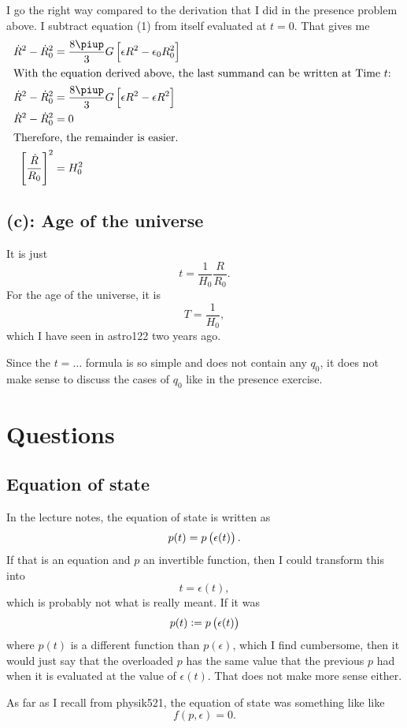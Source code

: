 I go the right way compared to the derivation that I did in the presence
problem above. I subtract equation (1) from itself evaluated at $t=0$. That
gives me
\begin{align*}
    \dot R^2 - \dot R_0^2 &= \frac{8\piup}3 G \sbr{\epsilon R^2 - \epsilon_0
R_0^2} \\
\intertext{%
    With the equation derived above, the last summand can be written at Time $t$:
}
    \dot R^2 - \dot R_0^2 &= \frac{8\piup}3 G \sbr{\epsilon R^2 - \epsilon
R^2} \\
    \dot R^2 - \dot R_0^2 &= 0 \\
\intertext{%
    Therefore, the remainder is easier.
}
\sbr{\frac{\dot R}{R_0}}^2 &= H_0^2
\end{align*}

\subsection*{(c): Age of the universe}

It is just
\[
    t = \frac{1}{H_0} \frac{R}{R_0}.
\]
For the age of the universe, it is
\[
    T = \frac{1}{H_0},
\]
which I have seen in astro122 two years ago.

Since the $t = \ldots$ formula is so simple and does not contain any $q_0$, it
does not make sense to discuss the cases of $q_0$ like in the presence
exercise.

\section*{Questions}

\subsection*{Equation of state}

In the lecture notes, the equation of state is written as
\[
    p(t) = p\del{\epsilon(t)}.
\]
If that is an equation and $p$ an invertible function, then I could transform
this into
\[
    t = \epsilon(t),
\]
which is probably not what is really meant. If it was
\[
    p(t) := p\del{\epsilon(t)}
\]
where $p(t)$ is a different function than $p(\epsilon)$, which I find
cumbersome, then it would just say that the overloaded $p$ has the same value
that the previous $p$ had when it is evaluated at the value of $\epsilon(t)$.
That does not make more sense either.

As far as I recall from physik521, the equation of state was something like
like
\[
    f(p, \epsilon) = 0.
\]

